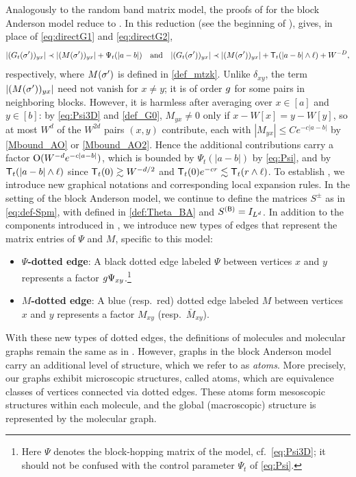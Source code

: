 Analogously to the random band matrix model, the proofs of  for the block Anderson model reduce to . In this reduction (see the beginning of ),  gives, in place of \eqref{eq:directG1} and \eqref{eq:directG2},
\[ |(G_t(\sigma'))_{yx}|\prec |(M(\sigma'))_{yx}|+\Psi_t(|a-b|)\quad\text{and}\quad |(G_t(\sigma'))_{yx}|\prec |(M(\sigma'))_{yx}|+{\mathsf T}_t(|a-b|\wedge\ell)+W^{-D}, \]
respectively, where $M(\sigma')$ is defined in \eqref{def_mtzk}. Unlike $\delta_{xy}$, the term $|(M(\sigma'))_{yx}|$ need not vanish for $x\ne y$; it is of order $g$ for some pairs in neighboring blocks. However, it is harmless after averaging over $x\in[a]$ and $y\in[b]$: by \eqref{eq:Psi3D} and \eqref{def_G0}, $M_{yx}\ne 0$ only if $x-W[x]=y-W[y]$, so at most $W^d$ of the $W^{2d}$ pairs $(x,y)$ contribute, each with $|M_{yx}|\le Ce^{-c|a-b|}$ by \eqref{Mbound_AO} or \eqref{Mbound_AO2}. Hence the additional contributions carry a factor $\operatorname{O}(W^{-d}e^{-c|a-b|})$, which is bounded by $\Psi_t(|a-b|)$ by \eqref{eq:Psi}, and by ${\mathsf T}_t(|a-b|\wedge\ell)$ since ${\mathsf T}_t(0)\gtrsim W^{-d/2}$ and ${\mathsf T}_t(0)e^{-cr}\lesssim{\mathsf T}_t(r\wedge\ell)$. To establish , we introduce new graphical notations and corresponding local expansion rules.
In the setting of the block Anderson model, we continue to define the matrices $S^\pm$ as in \eqref{eq:def-Spm}, with  defined in \eqref{def:Theta_BA} and $S^{({\mathsf{B}})}=I_{L^d}$. 
In addition to the components introduced in , we introduce new types of edges that represent the matrix entries of $\Psi$ and $M$, specific to this model: 
\begin{itemize}			
	
\item {\bf $\Psi$-dotted edge}: A black dotted edge labeled $\Psi$ between vertices $x$ and $y$ represents a factor $g\Psi_{xy}$.\footnote{Here $\Psi$ denotes the block-hopping matrix of the model, cf.~\eqref{eq:Psi3D}; it should not be confused with the control parameter $\Psi_t$ of \eqref{eq:Psi}.}

\item {\bf $M$-dotted edge}: A blue (resp.~red) dotted edge  labeled $M$ between vertices $x$ and $y$ represents a factor $M_{xy}$ (resp.~$\bar M_{xy}$).

\end{itemize}
With these new types of dotted edges, the definitions of molecules and molecular graphs remain the same as in . However, graphs in the block Anderson model carry an additional level of structure, which we refer to as \emph{atoms}. More precisely, our graphs exhibit microscopic structures, called atoms, which are equivalence classes of vertices connected via dotted edges. These atoms form mesoscopic structures within each molecule, and the global (macroscopic) structure is represented by the molecular graph.

